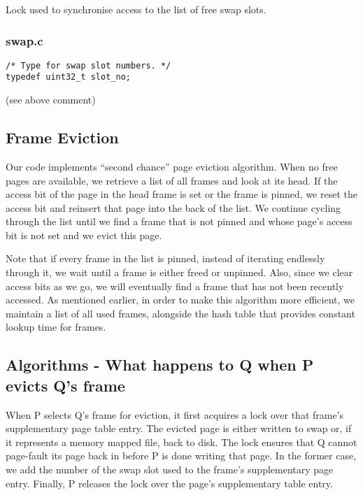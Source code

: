 Lock used to synchronise access to the list of free swap slots.

\subsubsection*{swap.c}

\begin{verbatim}
/* Type for swap slot numbers. */
typedef uint32_t slot_no;
\end{verbatim}

(see above comment)

\subsection{Frame Eviction}

Our code implements ``second chance'' page eviction algorithm.
When no free pages are available, we retrieve a list of all frames and look at its head.
If the access bit of the page in the head frame is set or the frame is pinned, we reset the access bit and reinsert that page into the back of the list.
We continue cycling through the list until we find a frame that is not pinned and whose page's access bit is not set and we evict this page.

Note that if every frame in the list is pinned, instead of iterating endlessly through it, we wait until a frame is either freed or unpinned.
Also, since we clear access bits as we go, we will eventually find a frame that has not been recently accessed.
As mentioned earlier, in order to make this algorithm more efficient, we maintain a list of all used frames, alongside the hash table that provides constant lookup time for frames.

\subsection{Algorithms - What happens to Q when P evicts Q's frame}

When P selects Q's frame for eviction, it first acquires a lock over that frame's supplementary page table entry.
The evicted page is either written to swap or, if it represents a memory mapped file, back to disk.
The lock ensures that Q cannot page-fault its page back in before P is done writing that page.
In the former case, we add the number of the swap slot used to the frame's supplementary page entry.
Finally, P releases the lock over the page's supplementary table entry.

